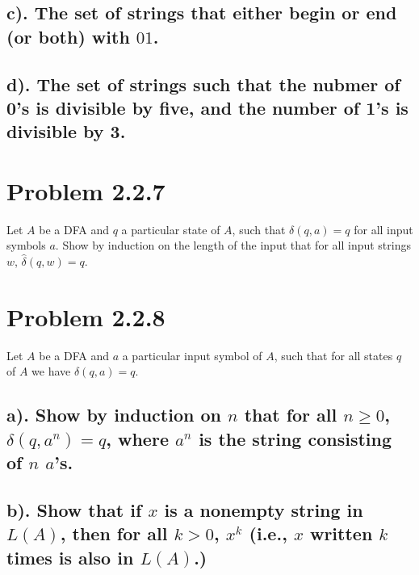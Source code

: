 \documentclass[20pt]{article} %
\begin{document}
\subsection{c). The set of strings that either begin or end (or both) with $01$.}

\subsection{d). The set of strings such that the nubmer of 0's is divisible by five, and the number of 1's is divisible by 3.}

\section{Problem 2.2.7}
Let $A$ be a DFA and $q$ a particular state of $A$, such that $\delta(q,a)=q$ for all input symbols $a$. 
Show by induction on the length of the input that for all input strings $w$, $\hat{\delta}(q,w)=q$.

\section{Problem 2.2.8}
Let $A$ be a DFA and $a$ a particular input symbol of $A$, such that for all states $q$ of $A$ we have $\delta(q,a)=q$.

\subsection{a). Show by induction on $n$ that for all $n\geq0$, $\delta(q,a^{n})=q$, where $a^{n}$ is the string consisting of $n$ $a$'s.}

\subsection{b). Show that if $x$ is a nonempty string in $L(A)$, then for all $k>0$, $x^{k}$ (i.e., $x$ written $k$ times is also in $L(A)$.)}
\end{document}
